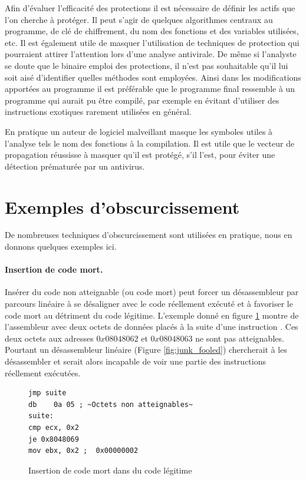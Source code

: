 Afin d'évaluer l'efficacité des protections il est nécessaire de définir les actifs que l'on cherche à protéger. 
Il peut s'agir de quelques algorithmes centraux au programme, de clé de chiffrement, du nom des fonctions et des variables utilisées, etc.
Il est également utile de masquer l'utilisation de techniques de protection qui pourraient attirer l'attention lors d'une analyse antivirale. De même si l'analyste se doute que le binaire emploi des protections, il n'est pas souhaitable qu'il lui soit aisé d'identifier quelles méthodes sont employées. Ainsi dans les modifications apportées au programme il est préférable que le programme final ressemble à un programme qui aurait pu être compilé, par exemple en évitant d'utiliser des instructions exotiques rarement utilisées en général.


En pratique un auteur de logiciel malveillant masque les symboles utiles à l'analyse tels le nom des fonctions à la compilation. Il est utile que le vecteur de propagation réussisse à masquer qu'il est protégé, s'il l'est, pour éviter une détection prématurée par un antivirus. 

\section{Exemples d'obscurcissement}
De nombreuses techniques d'obscurcissement sont utilisées en pratique, nous en donnons quelques exemples ici.

\paragraph{Insertion de code mort.}
Insérer du code non atteignable (ou code mort) peut forcer un désassembleur par parcours linéaire à se désaligner avec le code réellement exécuté et à favoriser le code mort au détriment du code légitime.
L'exemple donné en figure \ref{fig:junk_right} montre de l'assembleur avec deux octets de données placés à la suite d'une instruction \jmp. Ces deux octets aux adresses $0x08048062$ et $0x08048063$ ne sont pas atteignables. Pourtant un désassembleur linéaire (Figure \ref{fig:junk_fooled}) chercherait à les désassembler et serait alors incapable de voir une partie des instructions réellement exécutées.

\begin{figure}
\begin{lstlisting}[language={[x86masm]Assembler}, escapechar=~]
jmp suite
db    0a 05	; ~Octets non atteignables~
suite:
cmp ecx, 0x2
je 0x8048069
mov ebx, 0x2 ;  0x00000002
\end{lstlisting}
\caption{Insertion de code mort dans du code légitime}
\label{fig:junk_right}
\end{figure}


